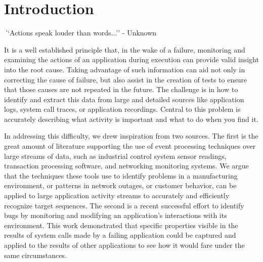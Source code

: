 \section{Introduction}
\label{SEC:introduction}


{\textit ``Actions speak louder than words...'' - Unknown}


It is a well established principle
that, in the wake of a failure,
monitoring and examining the actions
of an application
during execution can provide valid insight
into the root cause.
Taking advantage of such information
can aid not only in correcting
the cause of failure,
but also assist in the creation
of tests to ensure
that those causes
are not repeated in the future.
The challenge is in
how to identify and extract this data
from large and detailed sources like application logs,
system call traces,
or application recordings.
Central to this problem
is accurately describing what activity is important
and what to do when you find it.

In addressing this difficulty,
we drew inspiration from two sources.
The first is
the great amount of literature
supporting the use of event
processing techniques over large streams of data, such as
industrial control system sensor readings,
transaction processing software,
and networking monitoring systems.
We argue that the techniques these tools use
to identify problems in a manufacturing environment,
or patterns in network outages,
or customer behavior,
can be applied
to large application activity streams to accurately
and efficiently recognize target sequences.
The second is a recent successful effort
to identify bugs by monitoring
and modifying an application's interactions with its environment.
This work demonstrated that specific properties
visible in the results of system calls
made by a failing application
could be captured and applied
to the results of other applications
to see how it would fare under the same circumstances.

